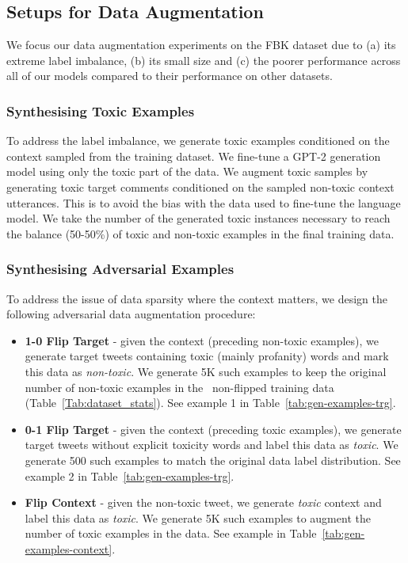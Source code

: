\documentclass[acmsmall]{acmart}
\begin{document}
\subsection{Setups for Data Augmentation}
We focus our data augmentation experiments on the FBK dataset due to (a) its extreme label imbalance, (b) its small size and (c) the poorer performance across all of our models compared to their performance on other datasets.

\subsubsection{Synthesising Toxic Examples\label{ssec:data_aug}}

To address the label imbalance, we generate toxic examples conditioned on the context sampled from the training dataset. We fine-tune a GPT-2 generation model \cite{gpt-2} using only the toxic part of the data. We augment toxic samples by generating toxic target comments conditioned on the sampled non-toxic context utterances. This is to avoid the bias with the data used to fine-tune the language model. We take the number of the generated toxic instances necessary to reach the balance (50-50\%) of toxic and non-toxic examples in the final training data.

\subsubsection{Synthesising Adversarial Examples}
To address the issue of data sparsity where the context matters, we design the following adversarial data augmentation procedure:
\begin{itemize}
    \item \textbf{1-0 Flip Target} - given the context (preceding non-toxic examples), we generate target tweets containing toxic (mainly profanity) words and mark this data as \textit{non-toxic}. We generate 5K such examples to keep the original number of non-toxic examples in the~\cite{FBK} non-flipped training data (Table~\ref{Tab:dataset_stats}). See example 1 in Table~\ref{tab:gen-examples-trg}.
    \item \textbf{0-1 Flip Target} - given the context (preceding toxic examples), we generate target tweets without explicit toxicity words and label this data as \textit{toxic}. We generate 500 such examples to match the original data label distribution. See example 2 in Table~\ref{tab:gen-examples-trg}.
    \item \textbf{Flip Context} - given the non-toxic tweet, we generate \textit{toxic} context and label this data as \textit{toxic}. We generate 5K such examples to augment the number of toxic examples in the \cite{FBK} data. See example in Table~\ref{tab:gen-examples-context}.
    \end{itemize}
\end{document}
